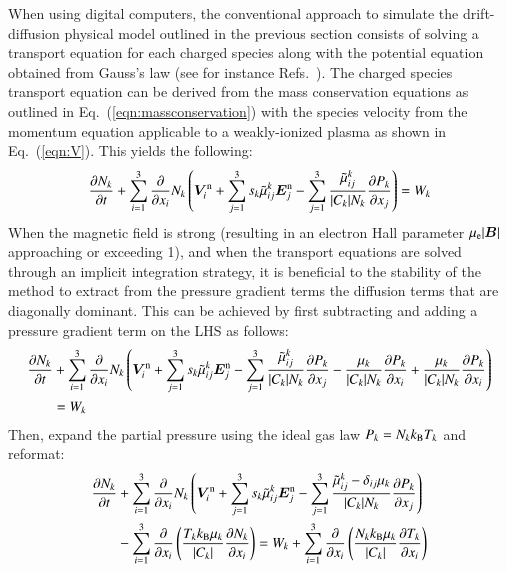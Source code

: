 \documentclass{warpdoc}
\newcommand{\nd}{3}
\renewcommand{\vec}[1]{\bm{#1}}
\begin{document}
When using digital computers, the conventional approach to simulate the drift-diffusion physical model outlined in the previous section  consists of solving a transport equation for each charged species along with the potential equation obtained from Gauss's law (see for instance Refs.\ \cite{jcp:2004:surzhikov,jpp:2008:poggie,jap:2009:shang,book:2012:surzhikov,aiaaconf:2014:surzhikov}). The charged species transport equation can be derived from the mass conservation equations as outlined in Eq.\ (\ref{eqn:massconservation}) with the species velocity from the momentum equation applicable to a weakly-ionized plasma as shown in Eq.\ (\ref{eqn:V}). This  yields the following:
%
\begin{equation}
  \frac{\partial N_k}{\partial t} + \sum_{i=1}^3 \frac{\partial}{\partial x_i} N_k\left(\vec{V}^{\rm n}_i+\sum_{j=1}^\nd s_k \wtilde{\mu}^k_{ij}  \vec{E}_j^{\rm n}
             - \sum_{j=1}^\nd  \frac{\wtilde{\mu}^{k}_{ij}}{|C_k| N_k} \frac{\partial P_k}{\partial x_j}\right) = W_k
\end{equation}
%
When the magnetic field is strong (resulting in an electron Hall parameter $\mu_{\rm e}|\vec{B}|$ approaching or exceeding 1), and when the transport equations are solved through an implicit integration strategy, it is beneficial to the stability of the method to extract from the pressure gradient terms the diffusion terms that are diagonally dominant. This can be achieved by first subtracting and adding a pressure gradient term on the LHS as follows:
%
\begin{align} 
 \frac{\partial N_k}{\partial t} &+ \sum_{i=1}^3 \frac{\partial}{\partial x_i} N_k\left(\vec{V}^{\rm n}_i+\sum_{j=1}^\nd s_k \wtilde{\mu}^k_{ij}  \vec{E}_j^{\rm n}
             - \sum_{j=1}^\nd  \frac{\wtilde{\mu}^{k}_{ij}}{|C_k| N_k} \frac{\partial P_k}{\partial x_j}
-\frac{\mu_k}{|C_k| N_k} \frac{\partial P_k}{\partial x_i} +\frac{\mu_k}{|C_k| N_k} \frac{\partial P_k}{\partial x_i}
\right)\nonumber\\ &= W_k
\end{align}
%
Then, expand the partial pressure using the ideal gas law $P_k=N_k k_{\rm B} T_k$ and reformat:
%
\begin{align}
  \frac{\partial N_k}{\partial t} &+ \sum_{i=1}^3 \frac{\partial}{\partial x_i} N_k\left(\vec{V}^{\rm n}_i+\sum_{j=1}^\nd s_k \wtilde{\mu}^k_{ij}  \vec{E}_j^{\rm n}
             - \sum_{j=1}^\nd  \frac{\wtilde{\mu}^{k}_{ij}-\delta_{ij} \mu_k}{|C_k| N_k} \frac{\partial P_k}{\partial x_j}\right)\nonumber\\
&-\sum_{i=1}^3 \frac{\partial}{\partial x_i} \left(\frac{T_k k_{\rm B} \mu_k}{|C_k| } \frac{\partial N_k}{\partial x_i} \right)
=W_k+
\sum_{i=1}^3 \frac{\partial}{\partial x_i} \left(\frac{N_k k_{\rm B} \mu_k}{|C_k| } \frac{\partial T_k}{\partial x_i}
\right)  
\end{align}
\end{document}
